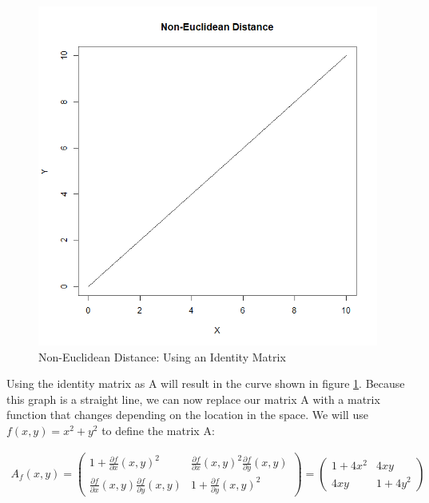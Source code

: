 \documentclass[12pt]{article}
\begin{document}
	\begin{figure}[h!]
		\centering
		\includegraphics[scale = 0.27]{non-euclidean-distance-const.png}
		\caption{Non-Euclidean Distance: Using an Identity Matrix}
		\label{non-euclidean-const-results}
	\end{figure}
	
	Using the identity matrix as A will result in the curve shown in figure \ref{non-euclidean-const-results}. Because this graph is a straight line, we can now replace our matrix A with a matrix function that changes depending on the location in the space. We will use $f(x, y) = x^2 + y^2$ to define the matrix A:
	
	\begin{align}
		A_f(x, y) = \begin{pmatrix}
			1 + \frac{\partial f}{\partial x}(x, y)^2 & \frac{\partial f}{\partial x}(x, y)^2\frac{\partial f}{\partial y}(x, y) \\
			\frac{\partial f}{\partial x}(x, y)\frac{\partial f}{\partial y}(x, y) & 1 + \frac{\partial f}{\partial y}(x, y)^2
		\end{pmatrix} = \begin{pmatrix}
			1 + 4x^2 & 4xy \\
			4xy & 1 + 4y^2
		\end{pmatrix}
	\end{align}
	
\end{document}
